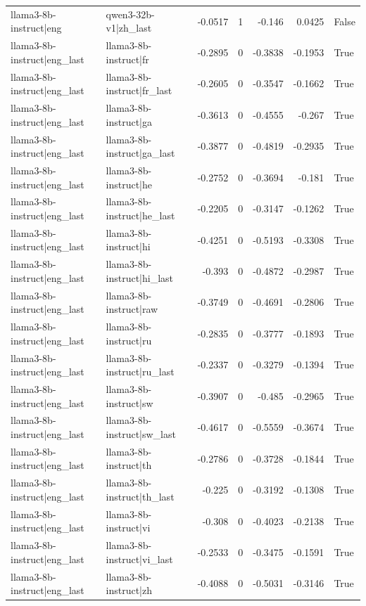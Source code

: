 \begin{table}
\begin{tabular}{l l r r r r l}
llama3-8b-instruct|eng & qwen3-32b-v1|zh_last & -0.0517 & 1 & -0.146 & 0.0425 & False \\
llama3-8b-instruct|eng_last & llama3-8b-instruct|fr & -0.2895 & 0 & -0.3838 & -0.1953 & True \\
llama3-8b-instruct|eng_last & llama3-8b-instruct|fr_last & -0.2605 & 0 & -0.3547 & -0.1662 & True \\
llama3-8b-instruct|eng_last & llama3-8b-instruct|ga & -0.3613 & 0 & -0.4555 & -0.267 & True \\
llama3-8b-instruct|eng_last & llama3-8b-instruct|ga_last & -0.3877 & 0 & -0.4819 & -0.2935 & True \\
llama3-8b-instruct|eng_last & llama3-8b-instruct|he & -0.2752 & 0 & -0.3694 & -0.181 & True \\
llama3-8b-instruct|eng_last & llama3-8b-instruct|he_last & -0.2205 & 0 & -0.3147 & -0.1262 & True \\
llama3-8b-instruct|eng_last & llama3-8b-instruct|hi & -0.4251 & 0 & -0.5193 & -0.3308 & True \\
llama3-8b-instruct|eng_last & llama3-8b-instruct|hi_last & -0.393 & 0 & -0.4872 & -0.2987 & True \\
llama3-8b-instruct|eng_last & llama3-8b-instruct|raw & -0.3749 & 0 & -0.4691 & -0.2806 & True \\
llama3-8b-instruct|eng_last & llama3-8b-instruct|ru & -0.2835 & 0 & -0.3777 & -0.1893 & True \\
llama3-8b-instruct|eng_last & llama3-8b-instruct|ru_last & -0.2337 & 0 & -0.3279 & -0.1394 & True \\
llama3-8b-instruct|eng_last & llama3-8b-instruct|sw & -0.3907 & 0 & -0.485 & -0.2965 & True \\
llama3-8b-instruct|eng_last & llama3-8b-instruct|sw_last & -0.4617 & 0 & -0.5559 & -0.3674 & True \\
llama3-8b-instruct|eng_last & llama3-8b-instruct|th & -0.2786 & 0 & -0.3728 & -0.1844 & True \\
llama3-8b-instruct|eng_last & llama3-8b-instruct|th_last & -0.225 & 0 & -0.3192 & -0.1308 & True \\
llama3-8b-instruct|eng_last & llama3-8b-instruct|vi & -0.308 & 0 & -0.4023 & -0.2138 & True \\
llama3-8b-instruct|eng_last & llama3-8b-instruct|vi_last & -0.2533 & 0 & -0.3475 & -0.1591 & True \\
llama3-8b-instruct|eng_last & llama3-8b-instruct|zh & -0.4088 & 0 & -0.5031 & -0.3146 & True \\

\end{tabular}
\end{table}
